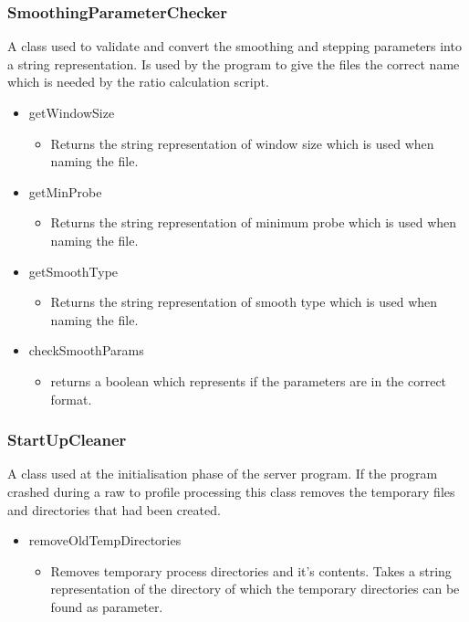 \subsubsection{SmoothingParameterChecker}

A class used to validate and convert the smoothing and stepping parameters into a string representation. Is used by the program to give the files the correct name which is needed by the ratio calculation script. 

\begin{itemize}
\item getWindowSize
\begin{itemize}
\item Returns the string representation of window size which is used when naming the file.
\end{itemize}
\item getMinProbe
\begin{itemize}
\item Returns the string representation of minimum probe which is used when naming the file.
\end{itemize}
\item getSmoothType
\begin{itemize}
\item Returns the string representation of smooth type which is used when naming the file.
\end{itemize}
\item checkSmoothParams
\begin{itemize}
\item returns a boolean which represents if the parameters are in the correct format.
\end{itemize}
\end{itemize}

\subsubsection{StartUpCleaner}

A class used at the initialisation phase of the server program. If the program crashed during a raw to profile processing this class removes the temporary files and directories that had been created.

\begin{itemize}
\item removeOldTempDirectories
\begin{itemize}
\item Removes temporary process directories and it's contents. Takes a string representation of the directory of which the temporary directories can be found as parameter.
\end{itemize}
\end{itemize}

